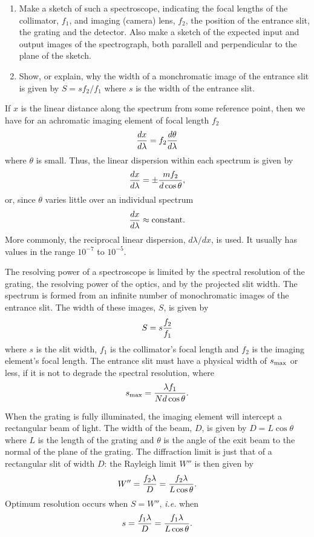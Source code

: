 \documentclass{article}
\begin{document}
\begin{enumerate}
\setcounter{enumi}{\value{count}}
\item Make a sketch of such a spectroscope, indicating the focal lengths
of the collimator, $f_1$, and imaging (camera) lens, $f_2$, the position of
the entrance slit, the grating and the detector. Also make a sketch
of the expected input and output images of the spectrograph, both
parallell and perpendicular to the plane of the sketch.
\item Show, or explain, why the width of a monchromatic image of the
  entrance slit is given by $S={sf_2/f_1}$ where $s$ is the width of
  the entrance slit.
\setcounter{count}{\value{enumi}} 
\end{enumerate}

If $x$ is the linear distance along the spectrum from some reference point, then we have
for an achromatic imaging element of focal length $f_2$
\[
{dx\over d\lambda}=f_2{d\theta\over d\lambda}
\]
where $\theta$ is small. Thus, the linear dispersion within each spectrum is given by
\[
{dx\over d\lambda}=\pm{mf_2\over d\cos\theta},
\]
or, since $\theta$ varies little over an individual spectrum
\[
{dx\over d\lambda}\approx {\rm constant}.
\]
More commonly, the reciprocal linear dispersion, ${d\lambda/dx}$, is used. It usually 
has values in the range $10^{-7}$ to $10^{-5}$.

The resolving power of a spectroscope is limited by the spectral resolution of the grating,
the resolving power of the optics, and by the projected slit width. The spectrum is formed
from an infinite number of monochromatic images of the entrance slit. The width of 
these images, $S$, is given by
\[
S=s{f_2\over f_1}
\]
where $s$ is the slit width, $f_1$ is the collimator's focal length and $f_2$ is the imaging element's focal length. The entrance slit must have a physical width of
$s_{\rm max}$ or less, if it is not to degrade the spectral resolution, where
\[
s_{\rm max}={\lambda f_1\over N d\cos\theta}.
\]

When the grating is fully illuminated, the imaging element will intercept a rectangular 
beam of light. The width of the beam, $D$, is given by $D=L\cos\theta$ where $L$ is 
the length of the grating and $\theta$ is the angle of the exit beam to the normal of the
plane of the grating. The diffraction limit is just that of a rectangular slit of width $D$:
the Rayleigh limit $W''$ is then given by 
\[
W''={f_2\lambda\over D}={f_2\lambda\over L\cos\theta}.
\]
Optimum resolution occurs when $S=W''$, {\it i.e.} when
\[ 
s={f_1\lambda\over D}={f_1\lambda\over L\cos\theta}.
\]
\end{document}
